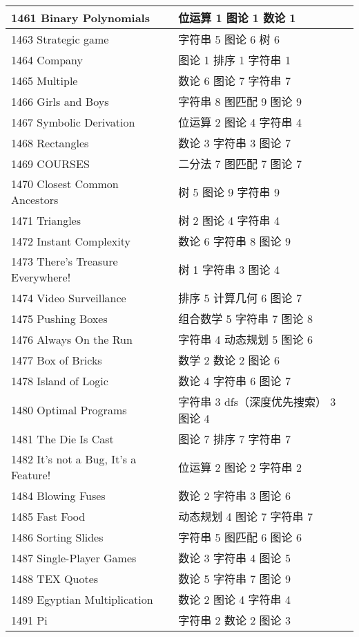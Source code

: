\begin{longtable}{| p{} | p{} |}
 1461 Binary Polynomials  & 位运算 1 图论 1 数论 1 \\ \hline
 1463 Strategic game  & 字符串 5 图论 6 树 6 \\ \hline
 1464 Company  & 图论 1 排序 1 字符串 1 \\ \hline
 1465 Multiple  & 数论 6 图论 7 字符串 7 \\ \hline
 1466 Girls and Boys  & 字符串 8 图匹配 9 图论 9 \\ \hline
 1467 Symbolic Derivation  & 位运算 2 图论 4 字符串 4 \\ \hline
 1468 Rectangles  & 数论 3 字符串 3 图论 7 \\ \hline
 1469 COURSES  & 二分法 7 图匹配 7 图论 7 \\ \hline
 1470 Closest Common Ancestors  & 树 5 图论 9 字符串 9 \\ \hline
 1471 Triangles  & 树 2 图论 4 字符串 4 \\ \hline
 1472 Instant Complexity  & 数论 6 字符串 8 图论 9 \\ \hline
 1473 There's Treasure Everywhere!  & 树 1 字符串 3 图论 4 \\ \hline
 1474 Video Surveillance  & 排序 5 计算几何 6 图论 7 \\ \hline
 1475 Pushing Boxes  & 组合数学 5 字符串 7 图论 8 \\ \hline
 1476 Always On the Run  & 字符串 4 动态规划 5 图论 6 \\ \hline
 1477 Box of Bricks  & 数学 2 数论 2 图论 6 \\ \hline
 1478 Island of Logic  & 数论 4 字符串 6 图论 7 \\ \hline
 1480 Optimal Programs  & 字符串 3 dfs（深度优先搜索） 3 图论 4 \\ \hline
 1481 The Die Is Cast  & 图论 7 排序 7 字符串 7 \\ \hline
 1482 It's not a Bug, It's a Feature!  & 位运算 2 图论 2 字符串 2 \\ \hline
 1484 Blowing Fuses  & 数论 2 字符串 3 图论 6 \\ \hline
 1485 Fast Food  & 动态规划 4 图论 7 字符串 7 \\ \hline
 1486 Sorting Slides  & 字符串 5 图匹配 6 图论 6 \\ \hline
 1487 Single-Player Games  & 数论 3 字符串 4 图论 5 \\ \hline
 1488 TEX Quotes  & 数论 5 字符串 7 图论 9 \\ \hline
 1489 Egyptian Multiplication  & 数论 2 图论 4 字符串 4 \\ \hline
 1491 Pi  & 字符串 2 数论 2 图论 3 \\ \hline

\end{longtable}
